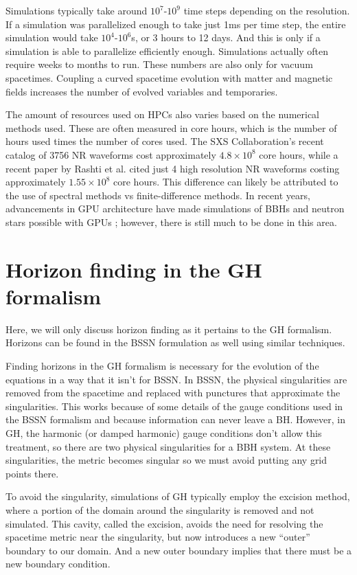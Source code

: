 \begin{bibunit}[unsrtnat]
Simulations typically take around $10^7$-$10^9$ time steps depending on the
resolution. If a simulation was parallelized enough to take just 1ms per time
step, the entire simulation would take $10^4$-$10^6$s, or 3 hours to 12 days.
And this is only if a simulation is able to parallelize efficiently enough.
Simulations actually often require weeks to months to run. These numbers are
also only for vacuum spacetimes. Coupling a curved spacetime evolution with
matter and magnetic fields increases the number of evolved variables and
temporaries.

The amount of resources used on HPCs also varies based on the numerical methods
used. These are often measured in core hours, which is the number of hours used
times the number of cores used. The SXS Collaboration's recent catalog of 3756
NR waveforms cost approximately $4.8\times 10^{8}$ core
hours\cite{Scheel:2025jct}, while a recent paper by Rashti et al. cited
just 4 high
resolution NR waveforms costing approximately $1.55\times 10^8$ core hours. This
difference can likely be attributed to the use of spectral methods vs
finite-difference methods. In recent years, advancements in GPU architecture
have made simulations of BBHs and neutron stars possible with GPUs
\cite{Peterson:2023azu,Shankar:2022ful,Kalinani:2024rbk,Zhu:2024utz,Fields:2024pob,Ji:2025rpd,Tootle:2025ikk};
however, there is still much to be done in this area.

\section{Horizon finding in the GH formalism\label{sec:intro_ah}}
Here, we will only discuss horizon finding as it pertains to the GH formalism.
Horizons can be found in the BSSN formulation as well using similar
techniques.

Finding horizons in the GH formalism is necessary for the evolution of the
equations in a way that it isn't for BSSN. In BSSN, the physical singularities
are removed from the spacetime and replaced with punctures that approximate
the singularities. This works because of some details of the gauge conditions
used in the BSSN formalism and
because information can never leave a BH. However, in GH, the harmonic (or
damped harmonic) gauge conditions don't allow this
treatment, so there are two physical
singularities for a BBH system. At these singularities, the metric becomes
singular so we must avoid putting any grid points there.

To avoid the singularity, simulations of GH typically employ the excision method,
where a portion of the domain around the singularity is removed and not
simulated. This cavity, called the excision, avoids the need for resolving the
spacetime metric near the singularity, but now introduces a new ``outer''
boundary to our domain. And a new outer boundary implies that there must be a
new boundary condition.


\end{bibunit}
